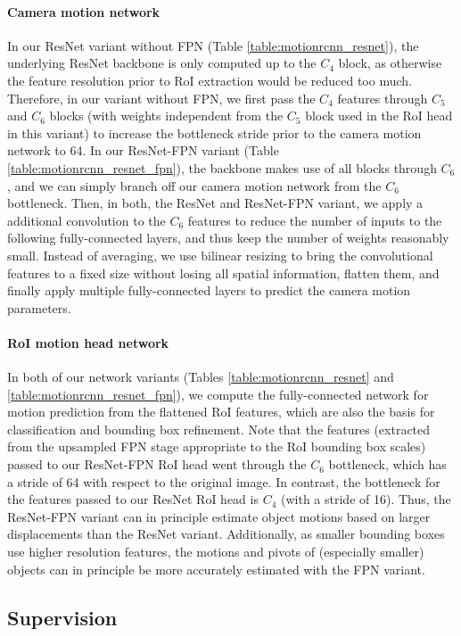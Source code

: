 \paragraph{Camera motion network}
In our ResNet variant without FPN (Table \ref{table:motionrcnn_resnet}), the underlying
ResNet backbone is only computed up to the $C_4$ block, as otherwise the
feature resolution prior to RoI extraction would be reduced too much.
Therefore, in our variant without FPN, we first pass the $C_4$ features through $C_5$
and $C_6$ blocks (with weights independent from the $C_5$ block used in the RoI head in this variant)
to increase the bottleneck stride prior to the camera motion network to 64.
In our ResNet-FPN variant (Table \ref{table:motionrcnn_resnet_fpn}),
the backbone makes use of all blocks through $C_6$, and
we can simply branch off our camera motion network from the $C_6$ bottleneck.
Then, in both, the ResNet and ResNet-FPN variant, we apply a additional
convolution to the $C_6$ features to reduce the number of inputs to the following
fully-connected layers, and thus keep the number of weights reasonably small.
Instead of averaging, we use bilinear resizing to bring the convolutional features
to a fixed size without losing all spatial information,
flatten them, and finally apply multiple fully-connected layers to predict the
camera motion parameters.

\paragraph{RoI motion head network}
In both of our network variants
(Tables \ref{table:motionrcnn_resnet} and \ref{table:motionrcnn_resnet_fpn}),
we compute the fully-connected network for motion prediction from the
flattened RoI features, which are also the basis for classification and
bounding box refinement.
Note that the features (extracted from the upsampled FPN stage appropriate to the RoI bounding box scales)
passed to our ResNet-FPN RoI head went through the $C_6$
bottleneck, which has a stride of 64 with respect to the original image.
In contrast, the bottleneck for the features passed to our ResNet RoI head
is $C_4$ (with a stride of 16). Thus, the ResNet-FPN variant can in principle estimate
object motions based on larger displacements than the ResNet variant.
Additionally, as smaller bounding boxes use higher resolution features, the
motions and pivots of (especially smaller) objects can in principle be more accurately
estimated with the FPN variant.

\subsection{Supervision}
\label{ssec:supervision}

